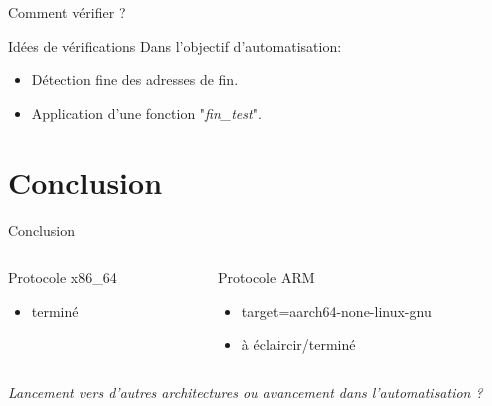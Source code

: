\documentclass[A4,svgnames,9pt,aspectratio=169]{beamer}
\begin{document}
\begin{frame}{Comment vérifier ?}
  \begin{block}{Idées de vérifications}
    Dans l'objectif d'automatisation:
    \begin{itemize}[<+->]
      \item Détection fine des adresses de fin.
      \item Application d'une fonction "\textit{fin\_test}".
    \end{itemize}
    
  \end{block}
\end{frame}


\section{Conclusion}
\frame{\sectionpage}

\begin{frame}{Conclusion}
  \vspace{2cm}
  \begin{columns}
    \begin{column}{0.5\textwidth}
      \begin{block}{Protocole x86\_64}
        \begin{itemize}
          \item terminé
        \end{itemize}        
      \end{block}
    \end{column}
    \begin{column}{0.5\textwidth}
      \vspace{0.5cm}
      \begin{block}{Protocole ARM}
        \begin{itemize}
          \item target=aarch64-none-linux-gnu
          \item à éclaircir/terminé
        \end{itemize}        
      \end{block}
       
    \end{column}
  \end{columns}

  \vspace{2cm}
  \small{\textit{Lancement vers d'autres architectures ou avancement dans l'automatisation ?}}

\end{frame}


\frame{\merci}
\end{document}

